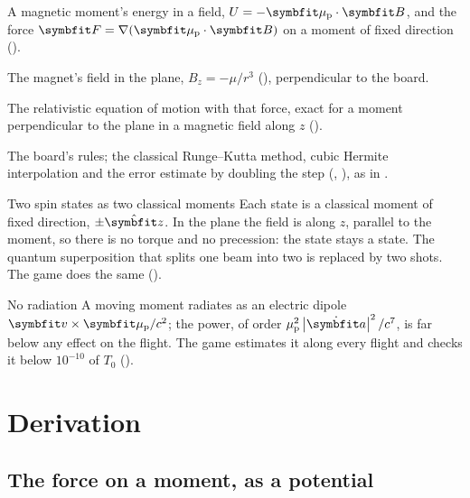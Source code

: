 \documentclass{leveldoc}
\begin{document}
\begin{principles}
  \item A magnetic moment's energy in a field, $U = -\vect{\mu}_\mathrm{p}\cdot\vect{B}$, and the
    force $\vect{F} = \nabla(\vect{\mu}_\mathrm{p}\cdot\vect{B})$ on a moment of fixed direction
    ().
  \item The magnet's field in the plane, $B_z = -\mu/r^3$ (),
    perpendicular to the board.
  \item The relativistic equation of motion  with that force, exact
    for a moment perpendicular to the plane in a magnetic field along $z$ ().
  \item The board's rules; the classical Runge--Kutta method, cubic Hermite interpolation and the
    error estimate by doubling the step (,
    ), as in .
\end{principles}

\begin{assumption}{Two spin states as two classical moments}\label{as:spin}
Each state is a classical moment of fixed direction, $\pm\uvec{z}$. In the plane the field is
along $z$, parallel to the moment, so there is no torque and no precession: the state stays a
state. The quantum superposition that splits one beam into two is replaced by two shots. The
game does the same ().
\end{assumption}

\begin{assumption}{No radiation}\label{as:radiation}
A moving moment radiates as an electric dipole $\vect{v}\times\vect{\mu}_\mathrm{p}/c^2$; the
power, of order $\mu_\mathrm{p}^2\abs{\dot{\vect{a}}}^2/c^7$, is far below any effect on the
flight. The game estimates it along every flight and checks it below $10^{-10}$ of $T_0$
().
\end{assumption}

\section{Derivation}\label{sec:derivation}

\subsection{The force on a moment, as a potential}\label{sec:potential}
\end{document}
